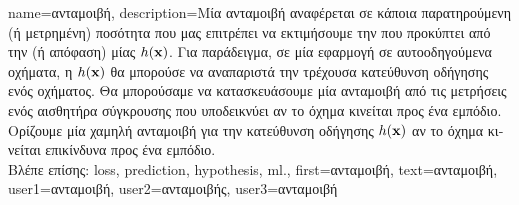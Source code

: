 {name={\foreignlanguage{greek}{ανταμοιβή}}, 
	description={\foreignlanguage{greek}{Μία ανταμοιβή αναφέρεται σε κάποια παρατηρούμενη}  
		\foreignlanguage{greek}{(ή μετρημένη) ποσότητα που μας επιτρέπει να εκτιμήσουμε την}   
		\foreignlanguage{greek}{που προκύπτει από την}  \foreignlanguage{greek}{(ή απόφαση) μίας}  
		$h({\bf x})$. \foreignlanguage{greek}{Για παράδειγμα, σε μία εφαρμογή}  
		 \foreignlanguage{greek}{σε αυτοοδηγούμενα οχήματα, η $h({\bf x})$ θα μπορούσε να αναπαριστά την τρέχουσα  
		κατεύθυνση οδήγησης ενός οχήματος. Θα μπορούσαμε να κατασκευάσουμε μία ανταμοιβή από τις μετρήσεις 
		ενός αισθητήρα σύγκρουσης που υποδεικνύει αν το όχημα κινείται προς ένα εμπόδιο. Ορίζουμε μία χαμηλή ανταμοιβή για την 
		κατεύ\-θυνση οδήγησης $h({\bf x})$ αν το όχημα κινείται επικίνδυνα προς ένα εμπόδιο.} \\
		\foreignlanguage{greek}{Βλέπε επίσης:} \gls{loss}, \gls{prediction}, \gls{hypothesis}, \gls{ml}.},
	first={\foreignlanguage{greek}{ανταμοιβή}}, 
	text={\foreignlanguage{greek}{ανταμοιβή}},
	user1={\foreignlanguage{greek}{ανταμοιβή}}, %
	user2={\foreignlanguage{greek}{ανταμοιβής}}, %
	user3={\foreignlanguage{greek}{ανταμοιβή}} %
} 

